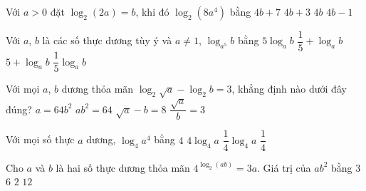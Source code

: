\begin{ex}%
	Với $a>0$  đặt $\log_2(2a)=b$, khi đó $\log_2(8a^4)$ bằng
	 \choice
		 {$4b+7$}
		 {$4b+3$}
		{$4b$} 
		{\True $4b-1$} 
\end{ex}

\begin{ex}%
	[Mã 101  - 2020 Lần 1] Với $a$, $b$ là các số thực dương tùy ý và $a\ne 1$, $\log_{a^5}b$ bằng
	 \choice
		{$5\log_ab$} 
		{$\dfrac{1}{5}+\log_ab$} 
		 {$5+\log_ab$}
		{\True  $\dfrac{1}{5}\log_ab$}
\end{ex}

\begin{ex}%
	Với mọi $a$, $b$ dương thỏa  mãn $\log_{2}\sqrt{a}-\log_{2}b=3$, khẳng định nào dưới đây đúng?
	\choice 
		{\True $a=64b^{2}$} 
		 {$ab^{2}=64$}
		 {$\sqrt{a}-b=8$}
		 {$\dfrac{\sqrt{a}}{b}=3$}
\end{ex}

\begin{ex}%
	Với mọi số  thực $a$ dương, $\log_{4}a^{4}$ bằng
	 \choice
		{$4$} 
		{\True  $4\log_{4}a$}
		{$\dfrac{1}{4}\log_{4}a$} 
		{$\dfrac{1}{4}$} 
\end{ex}

\begin{ex}%
	[Mã 102 - 2020 Lần 1] Cho $a$ và $b$ là hai số thực dương thỏa  mãn $4^{\log_2(ab)}=3a$. Giá trị của $ab^2$ bằng
	 \choice
		{\True $3$} 
		{$6$} 
		{$2$} 
		 {$12$}
\end{ex}

